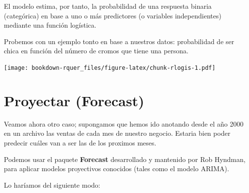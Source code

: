 \documentclass[]{book}
\newenvironment{Shaded}{\begin{snugshade}}{\end{snugshade}}
\newcommand{\CommentTok}[1]{\textcolor[rgb]{0.56,0.35,0.01}{\textit{#1}}}
\newcommand{\DataTypeTok}[1]{\textcolor[rgb]{0.13,0.29,0.53}{#1}}
\newcommand{\KeywordTok}[1]{\textcolor[rgb]{0.13,0.29,0.53}{\textbf{#1}}}
\newcommand{\NormalTok}[1]{#1}
\newcommand{\OperatorTok}[1]{\textcolor[rgb]{0.81,0.36,0.00}{\textbf{#1}}}
\newcommand{\StringTok}[1]{\textcolor[rgb]{0.31,0.60,0.02}{#1}}
\theoremstyle{definition}
\theoremstyle{definition}
\theoremstyle{definition}
\theoremstyle{remark}
\begin{document}
El modelo estima, por tanto, la probabilidad de una respuesta binaria
(categórica) en base a uno o más predictores (o variables
independientes) mediante una función logística.

Probemos con un ejemplo tonto en base a nuestros datos: probabilidad de
ser chica en función del número de cromos que tiene una persona.

\begin{Shaded}
\end{Shaded}

\texttt{[image: bookdown-rquer\_files/figure-latex/chunk-rlogis-1.pdf]}

\hypertarget{proyectar-forecast}{%
\section{Proyectar (Forecast)}\label{proyectar-forecast}}

Veamos ahora otro caso; supongamos que hemos ido anotando desde el año
2000 en un archivo las ventas de cada mes de nuestro negocio. Estaria
bien poder predecir cuáles van a ser las de los proximos meses.

Podemos usar el paquete \textbf{Forecast} \citep{R-forecast}
desarrollado y mantenido por Rob Hyndman, para aplicar modelos
proyectivos conocidos (tales como el modelo ARIMA).

Lo haríamos del siguiente modo:
\end{document}
